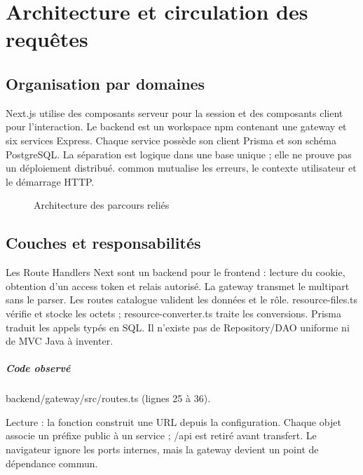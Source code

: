 \chapter{Architecture et circulation des requêtes}
\section{Organisation par domaines}
Next.js utilise des composants serveur pour la session et des composants client pour l’interaction. Le backend est un workspace npm contenant une gateway et six services Express. Chaque service possède son client Prisma et son schéma PostgreSQL. La séparation est logique dans une base unique ; elle ne prouve pas un déploiement distribué. common mutualise les erreurs, le contexte utilisateur et le démarrage HTTP.

\begin{figure}[ht]\centering{}\caption{Architecture des parcours reliés}\end{figure}
\section{Couches et responsabilités}
Les Route Handlers Next sont un backend pour le frontend : lecture du cookie, obtention d’un access token et relais autorisé. La gateway transmet le multipart sans le parser. Les routes catalogue valident les données et le rôle. resource-files.ts vérifie et stocke les octets ; resource-converter.ts traite les conversions. Prisma traduit les appels typés en SQL. Il n’existe pas de Repository/DAO uniforme ni de MVC Java à inventer.

\paragraph{Code observé} backend/gateway/src/routes.ts (lignes 25 à 36).

Lecture : la fonction construit une URL depuis la configuration. Chaque objet associe un préfixe public à un service ; /api est retiré avant transfert. Le navigateur ignore les ports internes, mais la gateway devient un point de dépendance commun.

